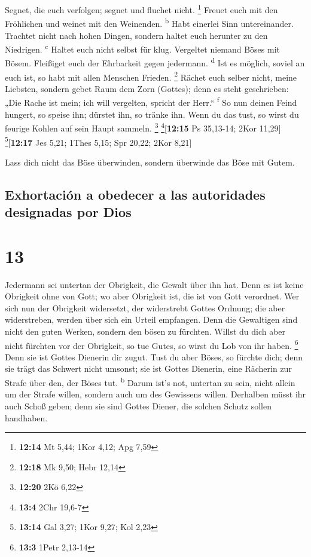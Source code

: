  Segnet, die euch verfolgen; segnet und fluchet nicht.
\footnote{\textbf{12:14} Mt 5,44; 1Kor 4,12; Apg 7,59} 
Freuet euch mit den Fröhlichen und weinet mit den Weinenden.
\textsuperscript{b}  Habt einerlei Sinn untereinander.
Trachtet nicht nach hohen Dingen, sondern haltet euch herunter zu den
Niedrigen. \textsuperscript{c}  Haltet euch nicht selbst
für klug. Vergeltet niemand Böses mit Bösem. Fleißiget euch der
Ehrbarkeit gegen jedermann. \textsuperscript{d}  Ist es
möglich, soviel an euch ist, so habt mit allen Menschen Frieden.
\footnote{\textbf{12:18} Mk 9,50; Hebr 12,14}  Rächet
euch selber nicht, meine Liebsten, sondern gebet Raum dem Zorn (Gottes);
denn es steht geschrieben: „Die Rache ist mein; ich will vergelten,
spricht der Herr.`` \textsuperscript{f}  So nun deinen
Feind hungert, so speise ihn; dürstet ihn, so tränke ihn. Wenn du das
tust, so wirst du feurige Kohlen auf sein Haupt sammeln. \footnote{\textbf{12:20}
  2Kö 6,22} \footnote{\textbf{13:4} 2Chr 19,6-7}{[}\textbf{12:15} Ps
35,13-14; 2Kor 11,29{]} \footnote{\textbf{13:14} Gal 3,27; 1Kor 9,27;
  Kol 2,23}{[}\textbf{12:17} Jes 5,21; 1Thes 5,15; Spr 20,22; 2Kor
8,21{]}

 Lass dich nicht das Böse überwinden, sondern überwinde
das Böse mit Gutem.

\hypertarget{exhortaciuxf3n-a-obedecer-a-las-autoridades-designadas-por-dios}{%
\subsection{Exhortación a obedecer a las autoridades designadas por
Dios}\label{exhortaciuxf3n-a-obedecer-a-las-autoridades-designadas-por-dios}}

\hypertarget{section-12}{%
\section{13}\label{section-12}}

 Jedermann sei untertan der Obrigkeit, die Gewalt über ihn
hat. Denn es ist keine Obrigkeit ohne von Gott; wo aber Obrigkeit ist,
die ist von Gott verordnet.  Wer sich nun der Obrigkeit
widersetzt, der widerstrebt Gottes Ordnung; die aber widerstreben,
werden über sich ein Urteil empfangen.  Denn die
Gewaltigen sind nicht den guten Werken, sondern den bösen zu fürchten.
Willst du dich aber nicht fürchten vor der Obrigkeit, so tue Gutes, so
wirst du Lob von ihr haben. \footnote{\textbf{13:3} 1Petr 2,13-14}
 Denn sie ist Gottes Dienerin dir zugut. Tust du aber
Böses, so fürchte dich; denn sie trägt das Schwert nicht umsonst; sie
ist Gottes Dienerin, eine Rächerin zur Strafe über den, der Böses tut.
\textsuperscript{b}  Darum ist's not, untertan zu sein,
nicht allein um der Strafe willen, sondern auch um des Gewissens willen.
 Derhalben müsst ihr auch Schoß geben; denn sie sind
Gottes Diener, die solchen Schutz sollen handhaben.


